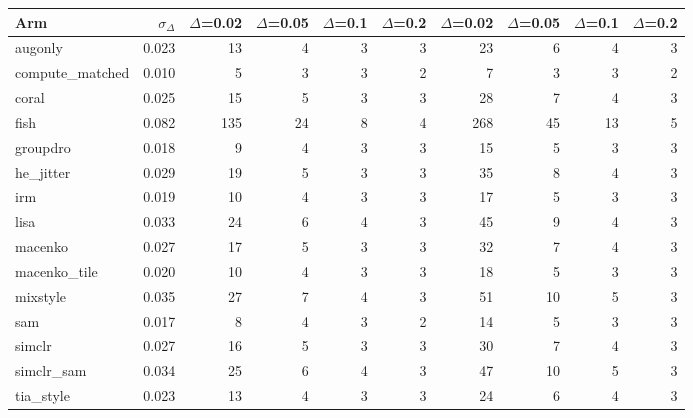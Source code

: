 \begin{tabular}{lrrrrrrrrr}
\toprule
Arm & $\sigma_\Delta$ & $\Delta$=0.02 & $\Delta$=0.05 & $\Delta$=0.1 & $\Delta$=0.2 & $\Delta$=0.02 & $\Delta$=0.05 & $\Delta$=0.1 & $\Delta$=0.2 \\
\midrule
augonly & 0.023 & 13 & 4 & 3 & 3 & 23 & 6 & 4 & 3 \\
compute\_matched & 0.010 & 5 & 3 & 3 & 2 & 7 & 3 & 3 & 2 \\
coral & 0.025 & 15 & 5 & 3 & 3 & 28 & 7 & 4 & 3 \\
fish & 0.082 & 135 & 24 & 8 & 4 & 268 & 45 & 13 & 5 \\
groupdro & 0.018 & 9 & 4 & 3 & 3 & 15 & 5 & 3 & 3 \\
he\_jitter & 0.029 & 19 & 5 & 3 & 3 & 35 & 8 & 4 & 3 \\
irm & 0.019 & 10 & 4 & 3 & 3 & 17 & 5 & 3 & 3 \\
lisa & 0.033 & 24 & 6 & 4 & 3 & 45 & 9 & 4 & 3 \\
macenko & 0.027 & 17 & 5 & 3 & 3 & 32 & 7 & 4 & 3 \\
macenko\_tile & 0.020 & 10 & 4 & 3 & 3 & 18 & 5 & 3 & 3 \\
mixstyle & 0.035 & 27 & 7 & 4 & 3 & 51 & 10 & 5 & 3 \\
sam & 0.017 & 8 & 4 & 3 & 2 & 14 & 5 & 3 & 3 \\
simclr & 0.027 & 16 & 5 & 3 & 3 & 30 & 7 & 4 & 3 \\
simclr\_sam & 0.034 & 25 & 6 & 4 & 3 & 47 & 10 & 5 & 3 \\
tia\_style & 0.023 & 13 & 4 & 3 & 3 & 24 & 6 & 4 & 3 \\
\bottomrule
\end{tabular}
